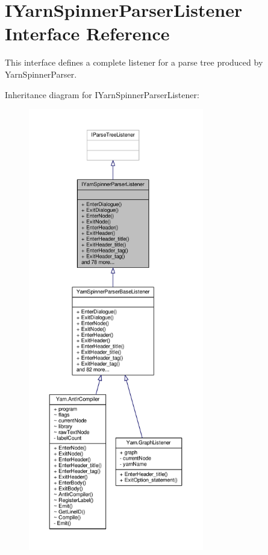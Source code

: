 \hypertarget{a00124}{\section{I\-Yarn\-Spinner\-Parser\-Listener Interface Reference}
\label{a00124}
}


This interface defines a complete listener for a parse tree produced by Yarn\-Spinner\-Parser.  




Inheritance diagram for I\-Yarn\-Spinner\-Parser\-Listener\-:
\nopagebreak
\begin{figure}[H]
\begin{center}
\leavevmode
\includegraphics[height=550pt]{a00399}
\end{center}
\end{figure}


